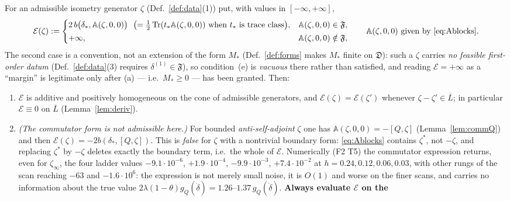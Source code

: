 \documentclass[11pt]{article}
\newcommand{\Aop}{\mathbb A}
\begin{document}
\begin{proposition}\label{prop:bdryfun}
For an admissible isometry generator $\zeta$ (Def.~\ref{def:data}(1)) put, with values in
$[-\infty,+\infty]$,
\begin{equation}\label{eq:Efun}
 \mathcal E(\zeta):=\begin{cases}
 2\,b\bigl(\delta_*,\Aop(\zeta,0,0)\bigr)
  \ \ \bigl(=\tfrac12\Tr(t_*\Aop(\zeta,0,0))\ \text{when $t_*$ is trace class}\bigr),
  & \Aop(\zeta,0,0)\in\mathfrak F,\\[2pt]
 +\infty, & \Aop(\zeta,0,0)\notin\mathfrak F,
 \end{cases}
 \qquad \Aop(\zeta,0,0)\ \text{given by \eqref{eq:Ablocks}} .
\end{equation}
The second case is a convention, not an extension of the form $M_*$ (Def.~\ref{def:forms}
makes $M_*$ finite on $\mathfrak D$): such a $\zeta$ carries \emph{no feasible first-order
datum} (Def.~\ref{def:data}(3) requires $\delta^{(1)}\in\mathfrak F$), so condition~(e) is
\emph{vacuous} there rather than satisfied, and reading $\mathcal E=+\infty$ as a
``margin'' is legitimate only after (a) --- i.e.\ $M_*\ge0$ --- has been granted.
Then:
\begin{enumerate}[leftmargin=1.6em,itemsep=1pt]
\item $\mathcal E$ is additive and positively homogeneous on the cone of admissible
 generators, and $\mathcal E(\zeta)=\mathcal E(\zeta')$ whenever $\zeta-\zeta'\in\overline L$;
 in particular $\mathcal E\equiv0$ on $\overline L$ (Lemma~\ref{lem:deriv}).
\item[{\rm(2$'$)}] \emph{(The commutator form is not admissible here.)}  For bounded
 \emph{anti-self-adjoint} $\zeta$ one has $\Aop(\zeta,0,0)=-[Q,\zeta]$
 (Lemma~\ref{lem:commQ}) and then $\mathcal E(\zeta)=-2b(\delta_*,[Q,\zeta])$.  This is
 \emph{false} for $\zeta$ with a nontrivial boundary form: \eqref{eq:Ablocks} contains
 $\zeta^*$, not $-\zeta$, and replacing $\zeta^*$ by $-\zeta$ deletes exactly the boundary
 term, i.e.\ the whole of $\mathcal E$.  Numerically (F2 T5) the commutator expression
 returns, even for $\zeta_\infty$, the four ladder values $-9.1\cdot10^{-6}$,
 $+1.9\cdot10^{-4}$, $-9.9\cdot10^{-3}$, $+7.4\cdot10^{-2}$ at $h=0.24,0.12,0.06,0.03$, with
 other rungs of the scan reaching $-63$ and $-1.6\cdot10^{6}$: the expression is not merely
 small noise, it is $O(1)$ and worse on the finer scans, and carries no information about
 the true value
 $2\lambda(1-\theta)g_Q(\dot\delta)=1.26$--$1.37\,g_Q(\dot\delta)$.  \textbf{Always evaluate $\mathcal E$ on the
}
\end{enumerate}
\end{proposition}
\end{document}
